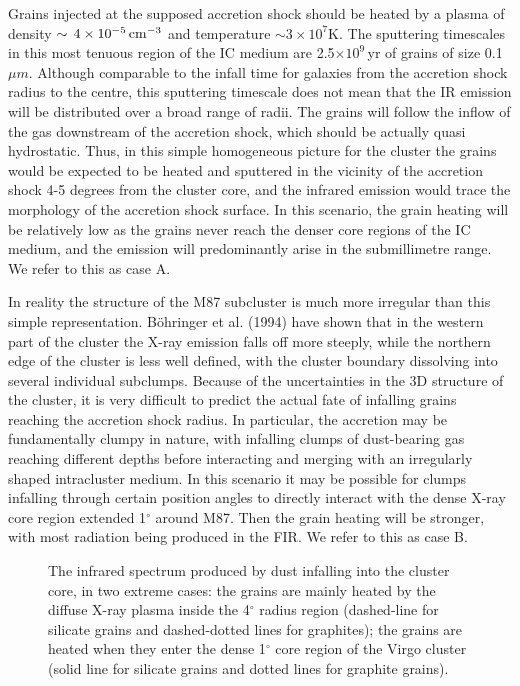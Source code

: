 \documentclass[]{aa}
\begin{document}
Grains injected at the supposed accretion shock should be heated by a plasma of
density $\sim\,4\times 10^{-5}\,{\rm cm}^{-3}$ and temperature 
$\sim 3\times10^{7}$K. The sputtering timescales in
this most tenuous region of the IC medium are 2.5$\times10^{9}$\,yr of grains
of size 0.1\,${\mu}m$.
Although comparable to the infall time for galaxies from the 
accretion shock radius to the centre, this sputtering timescale does not 
mean that the IR emission will be distributed over a broad range of radii.
The grains will follow the
inflow of the gas downstream of the accretion shock, which should be actually
quasi hydrostatic. Thus, in this simple homogeneous picture for the cluster 
the grains would be expected to be heated and sputtered in the 
vicinity of the accretion shock 4-5 degrees from the cluster core, and the 
infrared emission would trace the morphology of the accretion shock surface.
In this scenario, the grain heating will be relatively low as the grains
never reach the denser core regions of the IC medium, and the emission will
predominantly arise in the submillimetre range. We refer to this as case A.
 
In reality the structure of the M87 subcluster is much more 
irregular than this simple representation. B\"ohringer et al. (1994) 
have shown that in the western part 
of the cluster the X-ray emission falls off more steeply, while the northern 
edge of the cluster is less well defined, with the cluster boundary 
dissolving into several individual subclumps. 
Because of the uncertainties in the 3D structure of the cluster, it is very
difficult to predict the actual fate of infalling grains reaching the 
accretion shock radius. In particular, the accretion may be fundamentally 
clumpy in nature, with infalling clumps of dust-bearing gas reaching 
different depths before interacting and merging with an 
irregularly shaped intracluster medium. In this scenario it
may be possible for clumps infalling through certain position angles to 
directly interact with the dense X-ray core region extended 1$^{\circ}$
around M87. Then the grain heating will be stronger, with most radiation 
being produced in the FIR. We refer to this as case B.

\begin{figure}[htb]
\caption[]{The infrared spectrum produced by dust infalling into the cluster 
core, in two extreme cases: the grains are mainly heated by the diffuse X-ray
plasma inside the 4$^{\circ}$ radius region (dashed-line for silicate
grains and dashed-dotted lines for graphites); the grains are heated when 
they enter the dense 1$^{\circ}$ core region of the Virgo cluster 
(solid line for silicate grains and dotted lines for graphite grains).
 }
\end{figure} 
\end{document}
